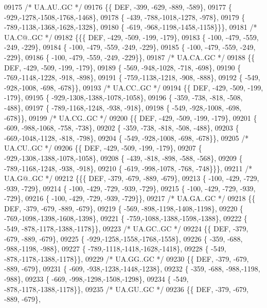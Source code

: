 \begin{DoxyCode}
09175 \textcolor{comment}{/* UA.AU..GC */}
09176 \{\{  DEF, -399, -629, -889, -589\},
09177 \{ -929,-1278,-1508,-1768,-1468\},
09178 \{ -439, -788,-1018,-1278, -978\},
09179 \{ -789,-1138,-1368,-1628,-1328\},
09180 \{ -619, -968,-1198,-1458,-1158\}\}\},
09181 \textcolor{comment}{/* UA.C@..GC */}
09182 \{\{\{  DEF, -429, -509, -199, -179\},
09183 \{ -100, -479, -559, -249, -229\},
09184 \{ -100, -479, -559, -249, -229\},
09185 \{ -100, -479, -559, -249, -229\},
09186 \{ -100, -479, -559, -249, -229\}\},
09187 \textcolor{comment}{/* UA.CA..GC */}
09188 \{\{  DEF, -429, -509, -199, -179\},
09189 \{ -569, -948,-1028, -718, -698\},
09190 \{ -769,-1148,-1228, -918, -898\},
09191 \{ -759,-1138,-1218, -908, -888\},
09192 \{ -549, -928,-1008, -698, -678\}\},
09193 \textcolor{comment}{/* UA.CC..GC */}
09194 \{\{  DEF, -429, -509, -199, -179\},
09195 \{ -929,-1308,-1388,-1078,-1058\},
09196 \{ -359, -738, -818, -508, -488\},
09197 \{ -789,-1168,-1248, -938, -918\},
09198 \{ -549, -928,-1008, -698, -678\}\},
09199 \textcolor{comment}{/* UA.CG..GC */}
09200 \{\{  DEF, -429, -509, -199, -179\},
09201 \{ -609, -988,-1068, -758, -738\},
09202 \{ -359, -738, -818, -508, -488\},
09203 \{ -669,-1048,-1128, -818, -798\},
09204 \{ -549, -928,-1008, -698, -678\}\},
09205 \textcolor{comment}{/* UA.CU..GC */}
09206 \{\{  DEF, -429, -509, -199, -179\},
09207 \{ -929,-1308,-1388,-1078,-1058\},
09208 \{ -439, -818, -898, -588, -568\},
09209 \{ -789,-1168,-1248, -938, -918\},
09210 \{ -619, -998,-1078, -768, -748\}\}\},
09211 \textcolor{comment}{/* UA.G@..GC */}
09212 \{\{\{  DEF, -379, -679, -889, -679\},
09213 \{ -100, -429, -729, -939, -729\},
09214 \{ -100, -429, -729, -939, -729\},
09215 \{ -100, -429, -729, -939, -729\},
09216 \{ -100, -429, -729, -939, -729\}\},
09217 \textcolor{comment}{/* UA.GA..GC */}
09218 \{\{  DEF, -379, -679, -889, -679\},
09219 \{ -569, -898,-1198,-1408,-1198\},
09220 \{ -769,-1098,-1398,-1608,-1398\},
09221 \{ -759,-1088,-1388,-1598,-1388\},
09222 \{ -549, -878,-1178,-1388,-1178\}\},
09223 \textcolor{comment}{/* UA.GC..GC */}
09224 \{\{  DEF, -379, -679, -889, -679\},
09225 \{ -929,-1258,-1558,-1768,-1558\},
09226 \{ -359, -688, -988,-1198, -988\},
09227 \{ -789,-1118,-1418,-1628,-1418\},
09228 \{ -549, -878,-1178,-1388,-1178\}\},
09229 \textcolor{comment}{/* UA.GG..GC */}
09230 \{\{  DEF, -379, -679, -889, -679\},
09231 \{ -609, -938,-1238,-1448,-1238\},
09232 \{ -359, -688, -988,-1198, -988\},
09233 \{ -669, -998,-1298,-1508,-1298\},
09234 \{ -549, -878,-1178,-1388,-1178\}\},
09235 \textcolor{comment}{/* UA.GU..GC */}
09236 \{\{  DEF, -379, -679, -889, -679\},

\end{DoxyCode}
